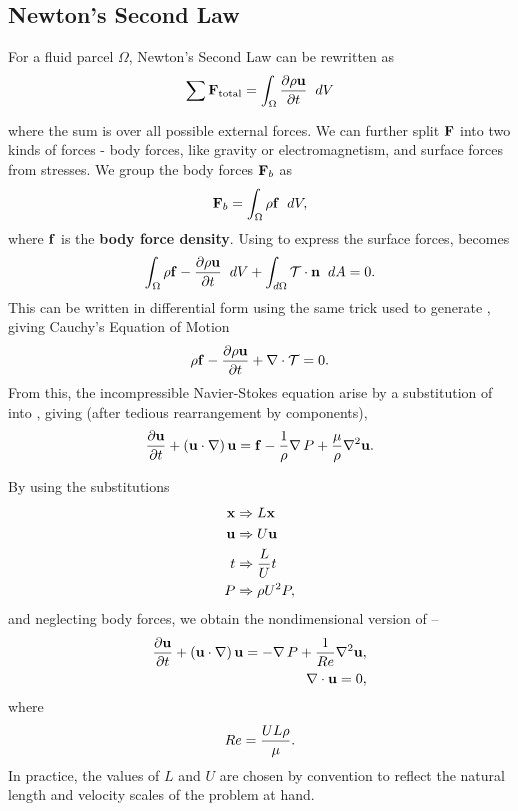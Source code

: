 \subsection{Newton's Second Law}
For a fluid parcel $\Omega$, Newton's Second Law can be rewritten as
\begin{equation}\label{eq:NSLInt}
\sum{}{}{\Vector{F}}_{\mathrm{total}} = \int{\Omega}{}{
							\pder{1}{\rho\Vector{u}}{t}}{dV}
\end{equation}
where the sum is over all possible external forces. We can further split $\mathbf{F}$ into two kinds of forces - body forces, like gravity or electromagnetism, and surface forces from stresses. We group the body forces $\mathbf{F}_b$ as \begin{equation}
\Vector{F}_b = \int{\Omega}{}{\rho\Vector{f}}{dV},
\end{equation}
where $\mathbf{f}$ is the {\bf body force density}. Using  to express the surface forces,  becomes
\begin{equation}
\int{\Omega}{}{\rho{\Vector{f}-\pder{1}{\rho\Vector{u}}{t}}}{dV} + \int{d\Omega}{}{\Tensor{T}\cdot\Vector{n}}{dA} = 0.
\end{equation}
This can be written in differential form using the same trick used to generate , giving Cauchy's Equation of Motion
\begin{equation}\label{eq:CauchyEOM}
\rho{\Vector{f}-\pder{1}{\rho\Vector{u}}{t} } + \Div{\Tensor{T}} = 0.
\end{equation}
From this, the incompressible Navier-Stokes equation arise by a substitution of  into , giving (after tedious rearrangement by components),
\begin{equation}\label{eq:NS}
\pder{1}{\Vector{u}}{t} + \paren{\Vector{u}\cdot\nabla}\Vector{u} = \Vector{f} - \frac{1}{\rho}\Grad{P} + \frac{\mu}{\rho}\nabla^2\Vector{u}.
\end{equation}

By using the substitutions
\begin{align}
\mathbf{x} &\Rightarrow L\mathbf{x}\\
\mathbf{u} &\Rightarrow U\mathbf{u}\\
t &\Rightarrow \dfrac{L}{U}t\\
P &\Rightarrow \rho U^2P,
\end{align}
and neglecting body forces, we obtain the nondimensional version of  --
\begin{align}
\pder{1}{\Vector{u}}{t} + \paren{\Vector{u}\cdot\nabla}\Vector{u} = -\Grad{P} + \frac{1}{\ReN}\nabla^2\Vector{u}\label{eq:NSND},\\
\nabla\cdot \Vector{u} = 0,
\end{align}
where \begin{equation}\label{eq:ReN}Re= \dfrac{UL\rho}{\mu}.\end{equation} In practice, the values of $L$ and $U$ are chosen by convention to reflect the natural length and velocity scales of the problem at hand.
 
